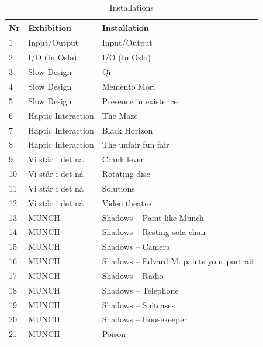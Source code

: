 \begin{table}[H]
\centering
\begin{tabular}{| l | l | l|}
\hline
\textbf{Nr} & \textbf{Exhibition} & \textbf{Installation}\\
\hline
1 & Input/Output & Input/Output  \\
2 & I/O (In Oslo) & I/O (In Oslo)\\
3 & Slow Design & Qi \\
4 & Slow Design & Memento Mori \\
5 & Slow Design & Presence in existence \\
6 & Haptic Interaction & The Maze \\
7 & Haptic Interaction & Black Horizon \\
8 & Haptic Interaction & The unfair fun fair \\
9 & Vi står i det nå & Crank lever \\
10 & Vi står i det nå & Rotating disc \\
11 & Vi står i det nå & Solutions \\
12 & Vi står i det nå & Video theatre \\
13 & MUNCH & Shadows -- Paint like Munch \\
14 & MUNCH & Shadows -- Resting sofa chair  \\
15 & MUNCH & Shadows -- Camera \\
16 & MUNCH & Shadows -- Edvard M. paints your portrait  \\
17 & MUNCH & Shadows -- Radio \\
18 & MUNCH & Shadows -- Telephone  \\
19 & MUNCH & Shadows -- Suitcases  \\
20 & MUNCH & Shadows -- Housekeeper  \\
21 & MUNCH & Poison  \\
\hline
\end{tabular}
\caption{Installations}
\label{tab:abc}
\end{table}



